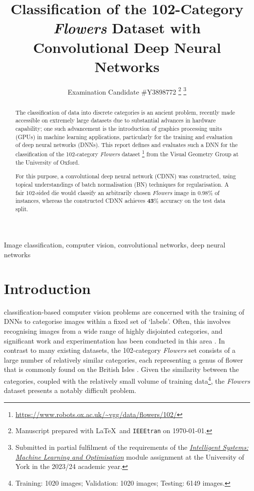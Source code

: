 \documentclass[journal]{IEEEtran}
\title{Classification of the 102-Category \emph{Flowers} Dataset with
    Convolutional Deep Neural Networks}
\author{Examination Candidate \#Y3898772%
    \thanks{Manuscript prepared with \LaTeX\ and \texttt{IEEEtran} on \today.}
    \thanks{Submitted in partial fulfilment of the requirements of the 
        \href{https://www.york.ac.uk/students/studying/manage/programmes/%
        module-catalogue/module/COM00026I/2023-24}{\emph{Intelligent Systems:
        Machine Learning and Optimisation}} module assignment at the University
        of York in the 2023/24 academic year.}%
}
\newcommand\networkperformance{43}
\begin{document}
\maketitle
\begin{abstract}
    The classification of data into discrete categories is an ancient problem,
    recently made accessible on extremely large datasets due to substantial
    advances in hardware capability; one such advancement is the introduction of
    graphics processing units (GPUs) in machine learning applications,
    particularly for the training and evaluation of deep neural networks (DNNs).
    This report defines and evaluates such a DNN for the classification of the
    102-category \emph{Flowers} dataset%
    \footnote{\url{https://www.robots.ox.ac.uk/~vgg/data/flowers/102/}} from the
    Visual Geometry Group at the University of Oxford.

    For this purpose, a convolutional deep neural network (CDNN) was
    constructed, using topical understandings of batch normalisation (BN)
    techniques for regularisation. A fair 102-sided die would classify an
    arbitrarily chosen \emph{Flowers} image in $\mathbf{0.98}$\% of instances,
    whereas the constructed CDNN achieves $\mathbf{\networkperformance}$\%
    accuracy on the test data split.
\end{abstract}
\begin{IEEEkeywords}
    Image classification, computer vision, convolutional networks, deep neural
    networks
\end{IEEEkeywords}
\section{Introduction}
 classification-based computer vision problems are
concerned with the training of DNNs to categorise images within a fixed set of
`labels'. Often, this involves recognising images from a wide range of highly
disjointed categories, and significant work and experimentation has been
conducted in this area \cite{Chen:2021}. In contrast to many existing datasets,
the 102-category \emph{Flowers} set consists of a large number of relatively
similar categories, each representing a genus of flower that is commonly found
on the British Isles \cite{Nilsback:2008}. Given the similarity between the
categories, coupled with the relatively small volume of training
data\footnote{Training: 1020 images; Validation: 1020 images; Testing: 6149
images.}, the \emph{Flowers} dataset presents a notably difficult problem.
\end{document}
